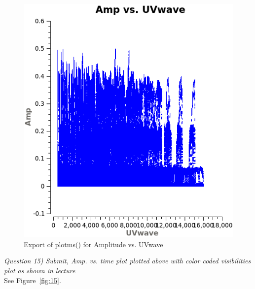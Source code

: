 \documentclass[12pt, a4paper]{article}
\begin{document}
\begin{figure}[h!]
    \centering
    \includegraphics[scale=0.65]{../Imaging/plots/Ampltide_vs_UVwave_vraag14-6.png}
    \caption{Export of plotms() for Amplitude vs. UVwave \label{fig:14-6}}
\end{figure}

\newpage

\noindent \textit{Question 15) Submit, Amp. vs. time plot plotted above with color coded visibilities plot as shown in lecture} \\
See Figure~\ref{fig:15}. \\
\end{document}

